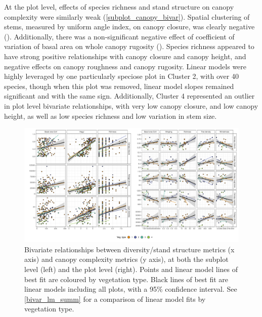 \documentclass[11pt,a4paper]{article}
\begin{document}
At the plot level, effects of species richness and stand structure on canopy complexity were similarly weak (\autoref{subplot_canopy_bivar}). Spatial clustering of stems, measured by uniform angle index, on canopy closure, was clearly negative (\winkelCoverP{}). Additionally, there was a non-significant negative effect of coefficient of variation of basal area on whole canopy rugosity (\baCovRugosityP{}). Species richness appeared to have strong positive relationships with canopy closure and canopy height, and negative effects on canopy roughness and canopy rugosity. Linear models were highly leveraged by one particularly speciose plot in Cluster 2, with over 40 species, though when this plot was removed, linear model slopes remained significant and with the same sign. Additionally, Cluster 4 represented an outlier in plot level bivariate relationships, with very low canopy closure, and low canopy height, as well as low species richness and low variation in stem size.

\begin{landscape}
\begin{figure}
	\includegraphics[width=\linewidth]{bivar}
	\caption[Bivariate plots comparing diversity, stand structure and canopy complexity]{Bivariate relationships between diversity/stand structure metrics (x axis) and canopy complexity metrics (y axis), at both the subplot level (left) and the plot level (right). Points and linear model lines of best fit are coloured by vegetation type. Black lines of best fit are linear models including all plots, with a 95\% confidence interval. See \autoref{bivar_lm_summ} for a comparison of linear model fits by vegetation type.}
	\label{subplot_canopy_bivar}
\end{figure}
\end{landscape}
\end{document}
